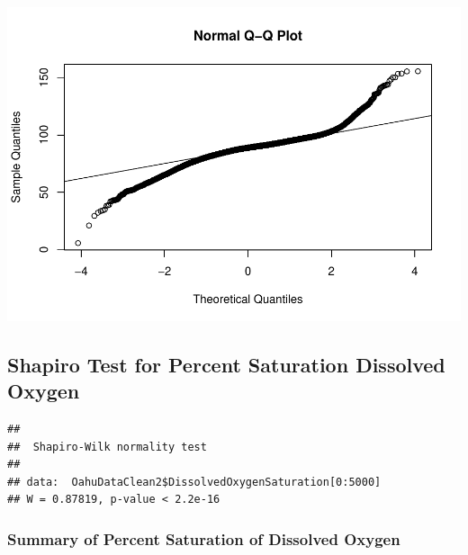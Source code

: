 \documentclass[12pt,]{article}
\newenvironment{Shaded}{\begin{snugshade}}{\end{snugshade}}
\newcommand{\KeywordTok}[1]{\textcolor[rgb]{0.13,0.29,0.53}{\textbf{#1}}}
\newcommand{\DecValTok}[1]{\textcolor[rgb]{0.00,0.00,0.81}{#1}}
\newcommand{\OperatorTok}[1]{\textcolor[rgb]{0.81,0.36,0.00}{\textbf{#1}}}
\newcommand{\NormalTok}[1]{#1}
\begin{document}
\includegraphics{Garcia_ENV872_Project_files/figure-latex/unnamed-chunk-37-1.pdf}

\subsection{Shapiro Test for Percent Saturation Dissolved
Oxygen}\label{shapiro-test-for-percent-saturation-dissolved-oxygen}

\begin{Shaded}
\end{Shaded}

\begin{verbatim}
## 
##  Shapiro-Wilk normality test
## 
## data:  OahuDataClean2$DissolvedOxygenSaturation[0:5000]
## W = 0.87819, p-value < 2.2e-16
\end{verbatim}

\subsubsection{Summary of Percent Saturation of Dissolved
Oxygen}\label{summary-of-percent-saturation-of-dissolved-oxygen}

\begin{Shaded}
\end{Shaded}
\end{document}
